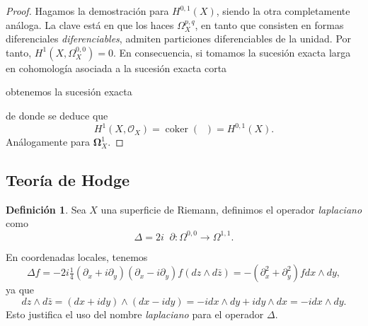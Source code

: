 \documentclass[autocontact]{gaceta}
\theoremstyle{definition} \newtheorem{defn}[thm]{Definición}
\theoremstyle{definition} \newtheorem{ejemplo}[thm]{Ejemplo}
\theoremstyle{definition} \newtheorem{ejercicio}[thm]{Ejercicio}
\def\OO{\mathscr{O}}
\DeclareMathOperator{\delbar}{\bar{\partial}}
\DeclareMathOperator{\coker}{coker}
\begin{document}
\begin{proof}
  Hagamos la demostración para $H^{0,1}(X)$, siendo la otra completamente análoga. La clave está en que los haces $\Omega_X^{p,q}$, en tanto que consisten en formas diferenciales \emph{diferenciables}, admiten particiones diferenciables de la unidad. Por tanto, $H^1(X,\Omega^{0,0}_X)=0$. En consecuencia, si tomamos la sucesión exacta larga en cohomología asociada a la sucesión exacta corta
 \begin{center}      \end{center}
   obtenemos la sucesión exacta
   \begin{center}
   \end{center}
   de donde se deduce que
   \begin{equation*}
     H^1(X,\OO_X) = \coker(\delbar) = H^{0,1}(X).
   \end{equation*}
   Análogamente para $\boldsymbol{\Omega}^1_X$.
\end{proof}

\subsection{Teoría de Hodge}
\begin{defn}
  Sea $X$ una superficie de Riemann, definimos el operador \emph{laplaciano} como
  \begin{equation*}
    \Delta = 2i \delbar \partial: \Omega^{0,0} \rightarrow \Omega^{1,1}.
  \end{equation*}
\end{defn}

En coordenadas locales, tenemos
\begin{equation*}
  \Delta f = -2i \tfrac{1}{4} (\partial_x + i \partial_y)(\partial_x - i \partial_y) f (dz\wedge d\bar{z})  = - (\partial_x^2  + \partial_y^2 ) f dx \wedge dy,
\end{equation*}
ya que
\begin{equation*}
  dz \wedge d\bar{z} = (dx+idy) \wedge (dx - idy) = -idx\wedge dy + i dy \wedge dx = -idx\wedge dy.
\end{equation*}
Esto justifica el uso del nombre \emph{laplaciano} para el operador $\Delta$. 
\end{document}
